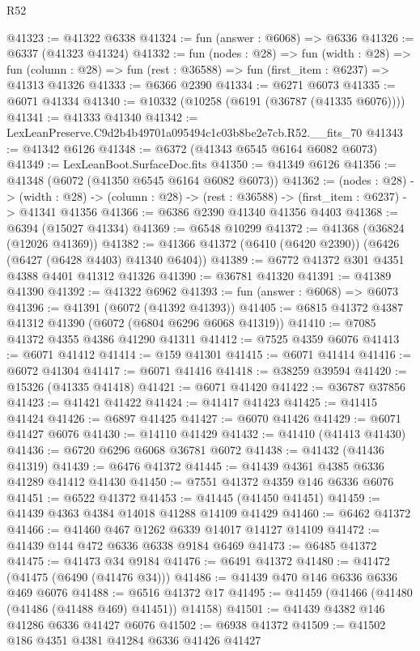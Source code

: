 \begin{lexlean}{R52}
\begin{coremodule}
@41323 := @41322 @6338
@41324 := fun (answer : @6068) => @6336
@41326 := @6337 (@41323 @41324)
@41332 := fun (nodes : @28) =>
  fun (width : @28) =>
  fun (column : @28) => fun (rest : @36588) => fun (first_item : @6237) => @41313 @41326
@41333 := @6366 @2390
@41334 := @6271 @6073
@41335 := @6071 @41334
@41340 := @10332 (@10258 (@6191 (@36787 (@41335 @6076))))
@41341 := @41333 @41340
@41342 := LexLeanPreserve.C9d2b4b49701a095494c1c03b8be2e7cb.R52.__fits_70
@41343 := @41342 @6126
@41348 := @6372 (@41343 @6545 @6164 @6082 @6073)
@41349 := LexLeanBoot.SurfaceDoc.fits
@41350 := @41349 @6126
@41356 := @41348 (@6072 (@41350 @6545 @6164 @6082 @6073))
@41362 := (nodes : @28) ->
  (width : @28) -> (column : @28) -> (rest : @36588) -> (first_item : @6237) -> @41341 @41356
@41366 := @6386 @2390 @41340 @41356 @4403
@41368 := @6394 (@15027 @41334)
@41369 := @6548 @10299
@41372 := @41368 (@36824 (@12026 @41369))
@41382 := @41366 @41372 (@6410 (@6420 @2390)) (@6426 (@6427 (@6428 @4403) @41340 @6404))
@41389 := @6772 @41372 @301 @4351 @4388 @4401 @41312 @41326
@41390 := @36781 @41320
@41391 := @41389 @41390
@41392 := @41322 @6962
@41393 := fun (answer : @6068) => @6073
@41396 := @41391 (@6072 (@41392 @41393))
@41405 := @6815 @41372 @4387 @41312 @41390 (@6072 (@6804 @6296 @6068 @41319))
@41410 := @7085 @41372 @4355 @4386 @41290 @41311
@41412 := @7525 @4359 @6076
@41413 := @6071 @41412
@41414 := @159 @41301
@41415 := @6071 @41414
@41416 := @6072 @41304
@41417 := @6071 @41416
@41418 := @38259 @39594
@41420 := @15326 (@41335 @41418)
@41421 := @6071 @41420
@41422 := @36787 @37856
@41423 := @41421 @41422
@41424 := @41417 @41423
@41425 := @41415 @41424
@41426 := @6897 @41425
@41427 := @6070 @41426
@41429 := @6071 @41427 @6076
@41430 := @14110 @41429
@41432 := @41410 (@41413 @41430)
@41436 := @6720 @6296 @6068 @36781 @6072
@41438 := @41432 (@41436 @41319)
@41439 := @6476 @41372
@41445 := @41439 @4361 @4385 @6336 @41289 @41412 @41430
@41450 := @7551 @41372 @4359 @146 @6336 @6076
@41451 := @6522 @41372
@41453 := @41445 (@41450 @41451)
@41459 := @41439 @4363 @4384 @14018 @41288 @14109 @41429
@41460 := @6462 @41372
@41466 := @41460 @467 @1262 @6339 @14017 @14127 @14109
@41472 := @41439 @144 @472 @6336 @6338 @9184 @6469
@41473 := @6485 @41372
@41475 := @41473 @34 @9184
@41476 := @6491 @41372
@41480 := @41472 (@41475 (@6490 (@41476 @34)))
@41486 := @41439 @470 @146 @6336 @6336 @469 @6076
@41488 := @6516 @41372 @17
@41495 := @41459 (@41466 (@41480 (@41486 (@41488 @469) @41451)) @14158)
@41501 := @41439 @4382 @146 @41286 @6336 @41427 @6076
@41502 := @6938 @41372
@41509 := @41502 @186 @4351 @4381 @41284 @6336 @41426 @41427

\end{coremodule}
\end{lexlean}
